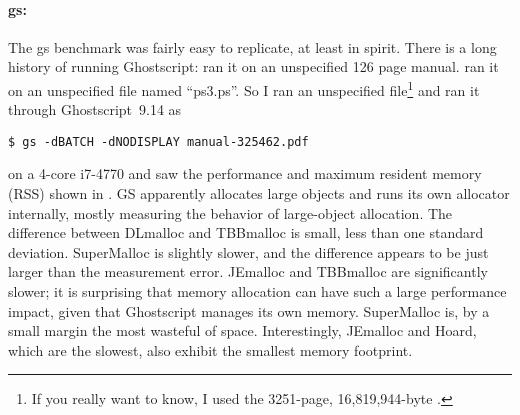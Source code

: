 \documentclass[natbib,sort&compress]{sigplanconf}
\begin{document}
{\paragraph{gs:}} The gs benchmark was fairly easy to replicate, at
least in spirit.  There is a long history of running Ghostscript:
\cite{DetlefsDoZo94} ran it on an unspecified 126 page manual.
\cite{Evans06} ran it on an unspecified file named ``ps3.ps''.  So I
ran an unspecified file\footnote{If you really want to know, I used
  the 3251-page, 16,819,944-byte \cite{Intel13}.}  and ran it through
Ghostscript~9.14 as
\begin{verbatim}
$ gs -dBATCH -dNODISPLAY manual-325462.pdf
\end{verbatim}
on a 4-core i7-4770 and saw the performance and maximum resident
memory (RSS) shown in .  GS apparently allocates large
objects and runs its own allocator internally, mostly measuring the
behavior of large-object allocation.  The difference between DLmalloc
and TBBmalloc is small, less than one standard deviation.  SuperMalloc
is slightly slower, and the difference appears to be just larger than
the measurement error.  JEmalloc and TBBmalloc are significantly
slower; it is surprising that memory allocation can have such a large
performance impact, given that Ghostscript manages its own memory.
SuperMalloc is, by a small margin the most wasteful of space.
Interestingly, JEmalloc and Hoard, which are the slowest, also exhibit
the smallest memory footprint.
\end{document}
